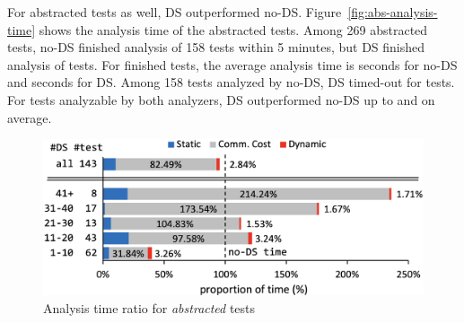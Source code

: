 For abstracted tests as well, DS outperformed no-DS.
Figure~\ref{fig:abs-analysis-time} shows the analysis time of the abstracted tests.
Among 269 abstracted tests, no-DS finished analysis of 158 tests within 5 minutes,
but DS finished analysis of  tests.  For finished tests, the average analysis
time is  seconds for no-DS and  seconds for DS. Among 158 tests analyzed by no-DS, DS
timed-out for  tests.  For  tests analyzable by both analyzers,
DS outperformed no-DS up to  and  on average.

\begin{figure}[t]
  \centering
  \includegraphics[width=\linewidth]{img/abs-analysis-ratio}
  \vspace*{-1.5em}
  \caption{Analysis time ratio for  \textit{abstracted} tests}
  \label{fig:abs-analysis-ratio}
  \vspace*{-1.5em}
\end{figure}

